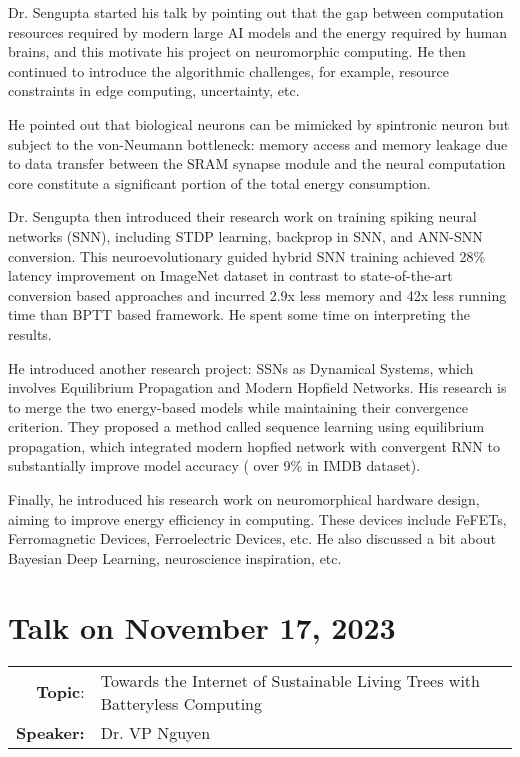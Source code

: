 \documentclass[11pt, oneside]{article}   	%
\begin{document}
Dr. Sengupta started his talk by pointing out that the gap between computation resources required by modern large AI models and the energy required by human brains, and this motivate his project on neuromorphic computing. He then continued to introduce the algorithmic challenges, for example, resource constraints in edge computing, uncertainty, etc.

He pointed out that biological neurons can be mimicked by spintronic neuron but subject to the von-Neumann bottleneck: memory access and memory leakage due to data transfer between the SRAM synapse module and the neural computation core constitute a significant portion of the total energy consumption. 

Dr. Sengupta then introduced their research work on training spiking neural networks (SNN), including STDP learning, backprop in SNN, and ANN-SNN conversion. This neuroevolutionary guided hybrid SNN training achieved 28\% latency improvement on ImageNet dataset in contrast to state-of-the-art conversion based approaches and incurred 2.9x less memory and 42x less running time than BPTT based framework. He spent some time on interpreting the results.

He introduced another research project: SSNs as Dynamical Systems, which involves Equilibrium Propagation and Modern Hopfield Networks. His research is to merge the two energy-based models while maintaining their convergence criterion. They proposed a method called sequence learning using equilibrium propagation, which integrated modern hopfied network with convergent RNN to substantially improve model accuracy ( over 9\% in IMDB dataset).

Finally, he introduced his research work on neuromorphical hardware design, aiming to improve energy efficiency in computing. These devices include FeFETs, Ferromagnetic Devices, Ferroelectric Devices, etc. He also discussed a bit about  Bayesian Deep Learning, neuroscience inspiration, etc. 



\newpage
\section{Talk on November 17, 2023}
\begin{tabularx} {\textwidth}{r X}
\textbf{Topic}: &Towards the Internet of Sustainable Living Trees with Batteryless Computing\\
\textbf{Speaker:} & Dr. VP Nguyen\\
\end{tabularx}
\end{document}

